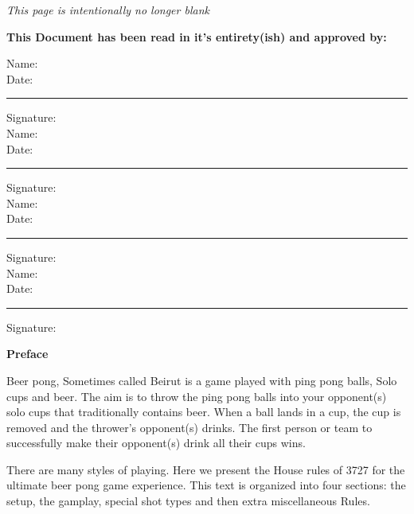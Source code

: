 \documentclass[11pt, oneside,letterpaper]{article}
\begin{document}
	

	\newpage\thispagestyle{empty}
	\emph{This page is intentionally no longer blank}

\newpage\thispagestyle{empty}
\textbf{This Document has been read in it's entirety(ish) and approved by: }

\vspace{1.5cm}
\noindent Name: \hrulefill \\[1cm]
Date: \rule{1.5in}{0.5pt}
\noindent Signature: \hrulefill \\[1.5cm]

\noindent Name: \hrulefill \\[1cm]
Date: \rule{1.5in}{0.5pt}
\noindent Signature: \hrulefill \\[1.5cm]

\noindent Name: \hrulefill \\[1cm]
Date: \rule{1.5in}{0.5pt}
\noindent Signature: \hrulefill \\[1.5cm]

\noindent Name: \hrulefill \\[1cm]
Date: \rule{1.5in}{0.5pt}
\noindent Signature: \hrulefill 


	\newpage\thispagestyle{empty}
	\tableofcontents \thispagestyle{empty}
	\newpage
	\setcounter{page}{1} %
	\begin{center}
		\textbf{Preface} \\
	\end{center}
		Beer pong, Sometimes called Beirut is a game played with ping pong balls, Solo cups and beer.
        The aim is to throw the ping pong balls into your opponent(s) solo cups that traditionally contains beer.
        When a ball lands in a cup, the cup is removed and the thrower's opponent(s) drinks.
        The first person or team to successfully make their opponent(s) drink all their cups wins.

		There are many styles of playing.
        Here we present the House rules of 3727 for the ultimate beer pong game experience. 
        This text is organized into four sections: the setup, the gamplay, special shot types and then extra miscellaneous Rules.

		







\end{document}
